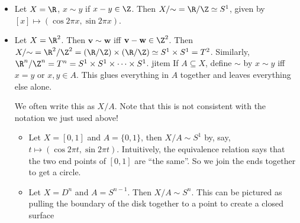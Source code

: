 \documentclass[a4paper]{article}
\begin{document}
\begin{eg}\leavevmode
  \begin{itemize}
    \item Let $X = \R$, $x\sim y$ if $x - y\in \Z$. Then $X/{\sim} = \R/\Z \simeq S^1$, given by $[x] \mapsto (\cos 2\pi x, \sin 2\pi x)$.
    \item Let $X = \R^2$. Then $\mathbf{v}\sim \mathbf{w}$ iff $\mathbf{v} - \mathbf{w} \in \Z^2$. Then $X/{\sim} = \R^2/\Z^2 = (\R/\Z)\times (\R/\Z) \simeq S^1\times S^1 = T^2$. Similarly, $\R^n/\Z^n = T^n = S^1\times S^1 \times \cdots \times S^1$.
    jitem If $A\subseteq X$, define $\sim$ by $x\sim y$ iff $x = y$ or $x, y\in A$. This glues everything in $A$ together and leaves everything else alone.

      We often write this as $X/A$. Note that this is not consistent with the notation we just used above!
      \begin{itemize}
        \item Let $X = [0, 1]$ and $A = \{0, 1\}$, then $X/A \sim S^1$ by, say, $t\mapsto (\cos 2\pi t, \sin 2\pi t)$. Intuitively, the equivalence relation says that the two end points of $[0, 1]$ are ``the same''. So we join the ends together to get a circle.
          \begin{center}
          \end{center}

        \item Let $X = D^n$ and $A = S^{n - 1}$. Then $X/A \sim S^n$. This can be pictured as pulling the boundary of the disk together to a point to create a closed surface

          \begin{center}
\end{center}
\end{itemize}
\end{itemize}
\end{eg}
\end{document}
